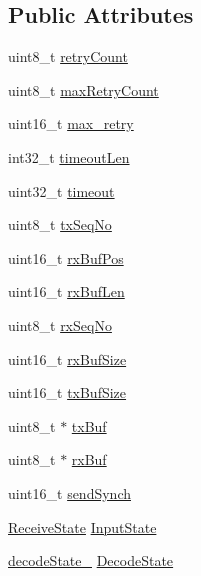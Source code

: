 \subsection*{\-Public \-Attributes}
\begin{DoxyCompactItemize}
\item 
uint8\-\_\-t \hyperlink{group___uploader_gaa59e48abe3c6ec88333502c7abd9c309}{retry\-Count}
\item 
uint8\-\_\-t \hyperlink{group___uploader_ga39fea4d573ab6d52b3b2df145d6d3f7a}{max\-Retry\-Count}
\item 
uint16\-\_\-t \hyperlink{group___uploader_ga6a20c78337e965260038e132527ba852}{max\-\_\-retry}
\item 
int32\-\_\-t \hyperlink{group___uploader_gacad18aa8d7e13c6500409da966437d3d}{timeout\-Len}
\item 
uint32\-\_\-t \hyperlink{group___uploader_gac5f404a47ec2583f83bd610d5f184308}{timeout}
\item 
uint8\-\_\-t \hyperlink{group___uploader_ga9add555476b07ac554ed3371358848bb}{tx\-Seq\-No}
\item 
uint16\-\_\-t \hyperlink{group___uploader_ga75073512a14d809c8ed03df447815d09}{rx\-Buf\-Pos}
\item 
uint16\-\_\-t \hyperlink{group___uploader_ga1de477395cd5f7c06623860c2d8017e4}{rx\-Buf\-Len}
\item 
uint8\-\_\-t \hyperlink{group___uploader_ga82ee05e7b1de6f1b55b375364ce5bc83}{rx\-Seq\-No}
\item 
uint16\-\_\-t \hyperlink{group___uploader_ga640561a803c92539943ec445afba5e72}{rx\-Buf\-Size}
\item 
uint16\-\_\-t \hyperlink{group___uploader_ga108da44374d16b8153824a65fec5a7ae}{tx\-Buf\-Size}
\item 
uint8\-\_\-t $\ast$ \hyperlink{group___uploader_gaf025f7e1a7f2a73bbc14602b9a5f1ee0}{tx\-Buf}
\item 
uint8\-\_\-t $\ast$ \hyperlink{group___uploader_ga934f922079e3cc67b83f3b27d377a1e4}{rx\-Buf}
\item 
uint16\-\_\-t \hyperlink{group___uploader_gafc6af17b7bd943cd40a0223eed26a0c3}{send\-Synch}
\item 
\hyperlink{group___uploader_gab10fc109fdda19fca8e7faf999d5a342}{\-Receive\-State} \hyperlink{group___uploader_ga4e66fb46404301e2985093c34ae57379}{\-Input\-State}
\item 
\hyperlink{group___uploader_gaca51c380bc924bd9e5d794ce37ec7194}{decode\-State\-\_\-} \hyperlink{group___uploader_gac689b116d4d7c80713d964bd631e9511}{\-Decode\-State}

\end{DoxyCompactItemize}
